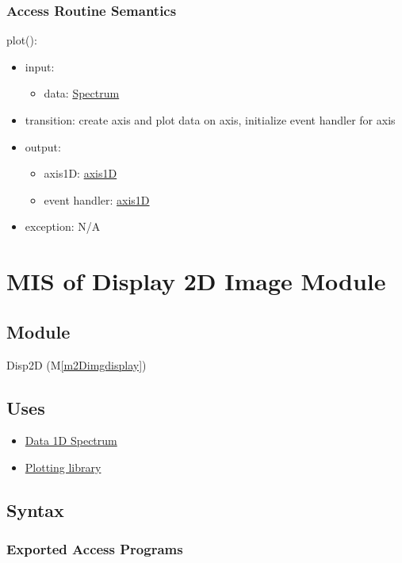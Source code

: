 \documentclass[12pt, titlepage]{article}
\newcommand{\mref}[1]{M\ref{#1}}
\begin{document}
\subsubsection{Access Routine Semantics}

\noindent plot():
\begin{itemize}
    \item input:
    \begin{itemize}
        \item data: \hyperref[Mod:Spectrum]{Spectrum}
    \end{itemize}
    \item transition: create axis and plot data on axis, initialize event
    handler for axis
    \item output:
    \begin{itemize}
        \item axis1D: \hyperref[Mod:Plotting]{axis1D}
        \item event handler: \hyperref[Mod:Plotting]{axis1D}
    \end{itemize}
    \item exception: N/A
\end{itemize}

\newpage
\section{MIS of Display 2D Image Module} \label{Mod:Disp2D}

\subsection{Module}

Disp2D (\mref{m2Dimgdisplay})

\subsection{Uses}
\begin{itemize}
    \item \hyperref[Mod:Spectrum]{Data 1D Spectrum}
    \item \hyperref[Mod:Plotting]{Plotting library}
\end{itemize}

\subsection{Syntax}

\subsubsection{Exported Access Programs}
\end{document}
